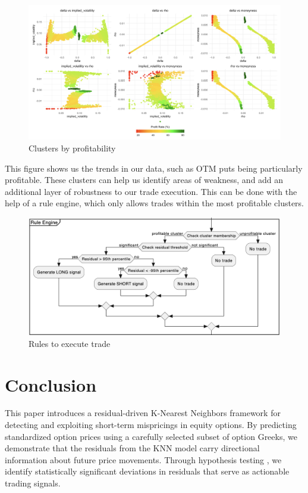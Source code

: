 \documentclass{article}
\begin{document}
\begin{figure}[h]
  \centering
  \includegraphics[width=1\linewidth]{data/results/clusters.png}
  \caption{Clusters by profitability}
  \label{fig:clusters}
\end{figure}

This figure shows us the trends in our data, such as OTM puts being particularly profitable. These clusters can help us identify areas of weakness, and add an additional layer of robustness to our trade execution. This can be done with the help of a rule engine, which only allows trades within the most profitable clusters.

\begin{figure}[h]
  \centering
  \includegraphics[width=0.8\linewidth]{data/results/algo.png}
  \caption{Rules to execute trade}
  \label{fig:algo}
\end{figure}

\section{Conclusion}

This paper introduces a residual-driven K-Nearest Neighbors framework for detecting and exploiting short-term mispricings in equity options. By predicting standardized option prices using a carefully selected subset of option Greeks, we demonstrate that the residuals from the KNN model carry directional information about future price movements. Through hypothesis testing , we identify statistically significant deviations in residuals that serve as actionable trading signals.
\end{document}
